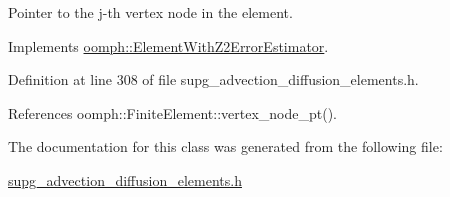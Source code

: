 Pointer to the j-\/th vertex node in the element. 



Implements \hyperlink{classoomph_1_1ElementWithZ2ErrorEstimator_a0eedccc33519f852c5dc2055ddf2774b}{oomph\+::\+Element\+With\+Z2\+Error\+Estimator}.



Definition at line 308 of file supg\+\_\+advection\+\_\+diffusion\+\_\+elements.\+h.



References oomph\+::\+Finite\+Element\+::vertex\+\_\+node\+\_\+pt().



The documentation for this class was generated from the following file\+:\begin{DoxyCompactItemize}
\item 
\hyperlink{supg__advection__diffusion__elements_8h}{supg\+\_\+advection\+\_\+diffusion\+\_\+elements.\+h}\end{DoxyCompactItemize}
